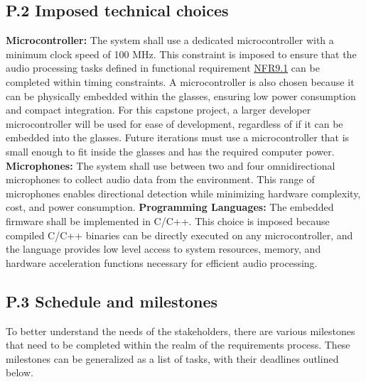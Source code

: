 \documentclass[12pt]{article}
\theoremstyle{definition}
\begin{document}
\subsection{P.2 Imposed technical choices}

\textbf{Microcontroller:}  
The system shall use a dedicated microcontroller with a minimum clock speed of
100 MHz. This constraint is imposed to ensure that the audio processing tasks
defined in functional requirement \hyperref[NFR9_1]{NFR9.1} can be completed
within timing constraints. A microcontroller is also chosen because it can be
physically embedded within the glasses, ensuring low power consumption and
compact integration. For this capstone project, a larger developer
microcontroller will be used for ease of development, regardless of if it can be
embedded into the glasses. Future iterations must use a microcontroller that is
small enough to fit inside the glasses and has the required computer power.
\newline
\newline
\textbf{Microphones:}  
The system shall use between two and four omnidirectional microphones to collect
audio data from the environment. This range of microphones enables directional
detection while minimizing hardware complexity, cost, and power consumption.
\newline
\newline
\textbf{Programming Languages:}  
The embedded firmware shall be implemented in C/C++. This choice is imposed
because compiled C/C++ binaries can be directly executed on any microcontroller,
and the language provides low level access to system resources, memory, and
hardware acceleration functions necessary for efficient audio processing.

\subsection{P.3 Schedule and milestones} \label{item: p3}   

To better understand the needs of the stakeholders, there are various milestones
 that need to be completed within the realm of the requirements process. These
 milestones can be generalized as a list of tasks, with their deadlines outlined
 below.
\end{document}
